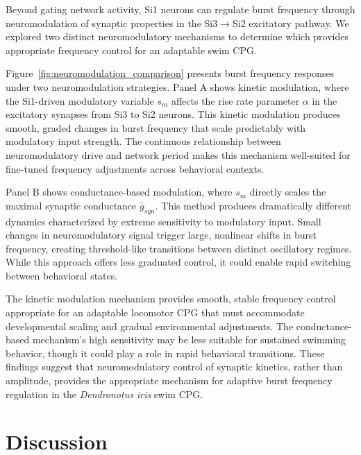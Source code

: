 \documentclass[nofootinbib,aip,amsmath,amssymb,preprint,twocolumn,floatfix,10pt]{revtex4-2}
\begin{document}
Beyond gating network activity, Si1 neurons can regulate burst frequency through neuromodulation of synaptic properties in the Si3$\to$Si2 excitatory pathway. We explored two distinct neuromodulatory mechanisms to determine which provides appropriate frequency control for an adaptable swim CPG.

Figure~\ref{fig:neuromodulation_comparison} presents burst frequency responses under two neuromodulation strategies. Panel A shows kinetic modulation, where the Si1-driven modulatory variable $s_m$ affects the rise rate parameter $\alpha$ in the excitatory synapses from Si3 to Si2 neurons. This kinetic modulation produces smooth, graded changes in burst frequency that scale predictably with modulatory input strength. The continuous relationship between neuromodulatory drive and network period makes this mechanism well-suited for fine-tuned frequency adjustments across behavioral contexts.

Panel B shows conductance-based modulation, where $s_m$ directly scales the maximal synaptic conductance $\bar{g}_{syn}$. This method produces dramatically different dynamics characterized by extreme sensitivity to modulatory input. Small changes in neuromodulatory signal trigger large, nonlinear shifts in burst frequency, creating threshold-like transitions between distinct oscillatory regimes. While this approach offers less graduated control, it could enable rapid switching between behavioral states.

The kinetic modulation mechanism provides smooth, stable frequency control appropriate for an adaptable locomotor CPG that must accommodate developmental scaling and gradual environmental adjustments. The conductance-based mechanism's high sensitivity may be less suitable for sustained swimming behavior, though it could play a role in rapid behavioral transitions. These findings suggest that neuromodulatory control of synaptic kinetics, rather than amplitude, provides the appropriate mechanism for adaptive burst frequency regulation in the \textit{Dendronotus iris} swim CPG.

\section{Discussion}
\end{document}
